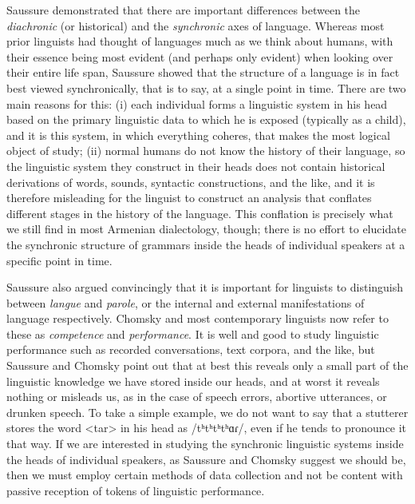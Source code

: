 \documentclass[output=paper]{langscibook}
\begin{document}
Saussure demonstrated that there are important differences between the \textit{diachronic} (or historical) and the \textit{synchronic} axes of language. Whereas most prior linguists had thought of languages much as we think about humans, with their essence being most evident (and perhaps only evident) when looking over their entire life span, Saussure showed that the structure of a language is in fact best viewed synchronically, that is to say, at a single point in time. There are two main reasons for this: (i) each individual forms a linguistic system in his head based on the primary linguistic data to which he is exposed (typically as a child), and it is this system, in which everything coheres, that makes the most logical object of study; (ii) normal humans do not know the history of their language, so the linguistic system they construct in their heads does not contain historical derivations of words, sounds, syntactic constructions, and the like, and it is therefore misleading for the linguist to construct an analysis that conflates different stages in the history of the language. This conflation is precisely what we still find in most Armenian dialectology, though; there is no effort to elucidate the synchronic structure of grammars inside the heads of individual speakers at a specific point in time.

Saussure also argued convincingly that it is important for linguists to distinguish between \textit{langue} and \textit{parole}, or the internal and external manifestations of language respectively.  Chomsky and most contemporary linguists now refer to these as \textit{competence} and \textit{performance}.  It is well and good to study linguistic performance such as recorded conversations, text corpora, and the like, but Saussure and Chomsky point out that at best this reveals only a small part of the linguistic knowledge we have stored inside our heads, and at worst it reveals nothing or misleads us, as in the case of speech errors, abortive utterances, or drunken speech. To take a simple example, we do not want to say that a stutterer stores the word <tar> in his head as   /tʰtʰtʰtʰɑɾ/, even if he tends to pronounce it that way.  If we are interested in studying the synchronic linguistic systems inside the heads of individual speakers, as Saussure and Chomsky suggest we should be, then we must employ certain methods of data collection and not be content with passive reception of tokens of linguistic performance.
\end{document}

